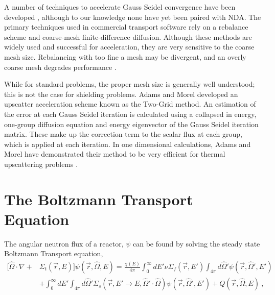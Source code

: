 A number of techniques to accelerate Gauss Seidel convergence have been developed \cite{morel-upscat} \cite{evans-upscat}, although to our knowledge none have yet been paired with NDA. The primary techniques used in commercial transport software rely on a rebalance scheme and coarse-mesh finite-difference diffusion.
Although these methods are widely used and successful for acceleration, they are very sensitive to the coarse mesh size. Rebalancing with too fine a mesh may be divergent, and an overly coarse mesh degrades performance \cite{evans-upscat}.

While for standard problems, the proper mesh size is generally well understood;
 this is not the case for shielding problems. Adams and Morel developed an upscatter acceleration scheme known as the Two-Grid method. An estimation of the error at each Gauss Seidel iteration is calculated using a collapsed in energy, one-group diffusion equation and energy eigenvector of the Gauss Seidel iteration matrix. These
  make up the correction term to the scalar flux at each group, which is applied at each iteration. In one dimensional calculations, Adams and Morel have demonstrated their method to be very efficient for thermal upscattering problems \cite{morel-upscat}.


\section{The Boltzmann Transport Equation}
The angular neutron flux of a reactor, $\psi$ can be found by solving the steady state Boltzmann Transport equation,
%
\begin{equation}
\begin{split}
  [\hat{\Omega} \cdot \nabla + &\Sigma_t(\vec{r}, E)]\psi(\vec{r}, \hat{\Omega}, E) = \frac{\chi(E)}{4\pi} \int_0^\infty dE' \nu \Sigma_{f}(\vec{r}, E') \int_{4\pi} d\hat{\Omega}'\psi(\vec{r}, \hat{\Omega}', E') \\   &+ \int_0^\infty dE' \int_{4\pi} d\hat{\Omega}' \Sigma_s(\vec{r}, E' \rightarrow E, \hat{\Omega}' \cdot \hat{\Omega})\psi(\vec{r}, \hat{\Omega}', E') + Q(\vec{r}, \hat{\Omega}, E)   \:,
\end{split}
\label{eq:transport}
\end{equation}

